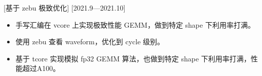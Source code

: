 \documentclass{resume}
\begin{document}
[基于 zebu 极致优化]
[2021.9—2021.10]

\begin{itemize}
  \item 手写汇编在 vcore 上实现极致性能 GEMM，做到特定 shape 下利用率打满。
  \item 使用 zebu 查看 waveform，优化到 cycle 级别。
  \item 基于 tcore 实现模拟 fp32 GEMM 算法，也做到特定 shape 下利用率打满，性能超过A100。
\end{itemize}
\end{document}
